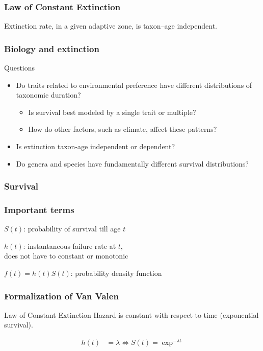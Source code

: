 \documentclass{beamer}
\begin{document}
\begin{frame}
  \frametitle{Law of Constant Extinction}

  \begin{definition}
    Extinction rate, in a given adaptive zone, is taxon--age independent.

    \tiny{}
  \end{definition}
\end{frame}

\begin{frame}
  \frametitle{Biology and extinction}

  \begin{block}{Questions}
    \begin{itemize}
      \item Do traits related to environmental preference have different distributions of taxonomic duration? 
        \begin{itemize}
          \item Is survival best modeled by a single trait or multiple? 
          \item How do other factors, such as climate, affect these patterns? 
        \end{itemize}
      \item Is extinction taxon-age independent or dependent?
      \item Do genera and species have fundamentally different survival distributions?
    \end{itemize}
  \end{block}
\end{frame}

\begin{frame}
  \frametitle{Survival}
\end{frame}

\begin{frame}
  \frametitle{Important terms}

  \(S(t)\): probability of survival till age \(t\)

  \(h(t)\): instantaneous failure rate at \(t\), \\does not have to constant or monotonic 

  \(f(t) = h(t)S(t)\): probability density function
\end{frame}

\begin{frame}
  \frametitle{Formalization of Van Valen}
  \begin{block}{Law of Constant Extinction}
    Hazard is constant with respect to time (\alert{exponential survival}).
  \end{block}

    \begin{align*}
      h(t) &= \lambda \iff S(t) = \exp^{-\lambda t}
    \end{align*}
\end{frame}
\end{document}
